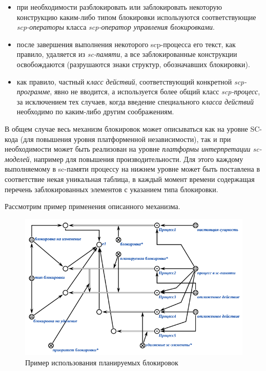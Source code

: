 \begin{itemize}
\item при необходимости разблокировать или заблокировать некоторую конструкцию каким-либо типом блокировки используются соответствующие \textit{scp-операторы} класса \textit{scp-оператор управления блокировками}.
\item после завершения выполнения некоторого scp-процесса его текст, как правило, удаляется из \textit{sc-памяти}, а все заблокированные конструкции освобождаются (разрушаются знаки структур, обозначавших блокировки).
\item как правило, частный \textit{класс действий}, соответствующий конкретной \textit{scp-программе}, явно не вводится, а используется более общий класс \textit{scp-процесс}, за исключением тех случаев, когда введение	специального \textit{класса действий} необходимо по каким-либо другим соображениям.
\end{itemize}

В общем случае весь механизм блокировок может описываться как на уровне SC-кода (для повышения уровня платформенной независимости), так и при необходимости может быть реализован на уровне \textit{платформы интерпретации sc-моделей}, например для повышения производительности. Для этого каждому выполняемому в sc-памяти процессу на нижнем уровне может быть поставлена в соответствие некая уникальная таблица, в каждый момент времени содержащая перечень заблокированных элементов с указанием типа блокировки.

Рассмотрим пример применения описанного механизма.

\begin{figure}[h]
	\centering
	\includegraphics[scale=0.8]{images/part3/chapter_situation_management/plan_lock_1.png}
	\caption{Пример использования планируемых блокировок}
	\label{fig:plan_lock_1}
\end{figure}

